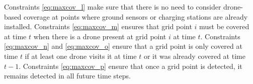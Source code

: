 \documentclass{article}
\begin{document}
Constraints \eqref{eq:maxcov_l} make sure that there is no need to consider drone-based coverage at points where ground sensors or charging stations are already installed. Constraints \eqref{eq:maxcov_m} ensures that grid point $i$ must be covered at time $t$ when there is a drone present at grid point $i$ at time $t$. Constraints \eqref{eq:maxcov_n} and \eqref{eq:maxcov_o} ensure that a grid point is only covered at time $t$ if at least one drone visits it at time $t$ or it was already covered at time $t-1$. Constraints \eqref{eq:maxcov_p} ensure that once a grid point is detected, it remains detected in all future time steps.






\end{document}
